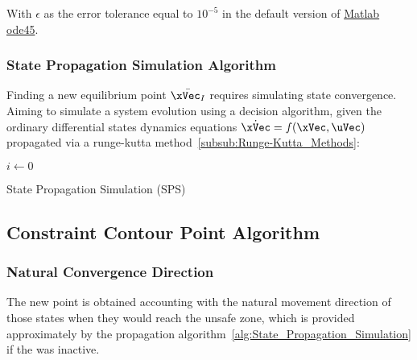 With \(\epsilon\) as the error tolerance equal to \(10^{-5}\) in the default version of \href{https://www.mathworks.com/help/matlab/ref/ode45.html}{Matlab ode45}.

\subsubsection{State Propagation Simulation Algorithm}
\label{subsub:State_Propagation_Simulation_Algorithm}

Finding a new equilibrium point \(\bar{\xVec_I}\) requires simulating state convergence. Aiming to simulate a system evolution using a decision algorithm, given the ordinary differential states dynamics equations \(\dot{\xVec} = f(\xVec,\uVec)\) propagated via a runge-kutta method~\ref{subsub:Runge-Kutta_Methods}:

  \begin{algorithm}
    \KwResult{$\xVec$, $\uVec$}
    $i \gets 0$ \;
    \caption{State Propagation Simulation (SPS)} \label{alg:State_Propagation_Simulation}
  \end{algorithm}


\newpage %

\subsection{Constraint Contour Point Algorithm}
\label{subsec:Constraint_Contour_Point_Algorithm}

\subsubsection{Natural Convergence Direction}
\label{subsubsec:Intersection_Vector}

The new point is obtained accounting with the natural movement direction of those states when they would reach the unsafe zone, which is provided approximately by the propagation algorithm~\ref{alg:State_Propagation_Simulation} if the  was inactive. 


